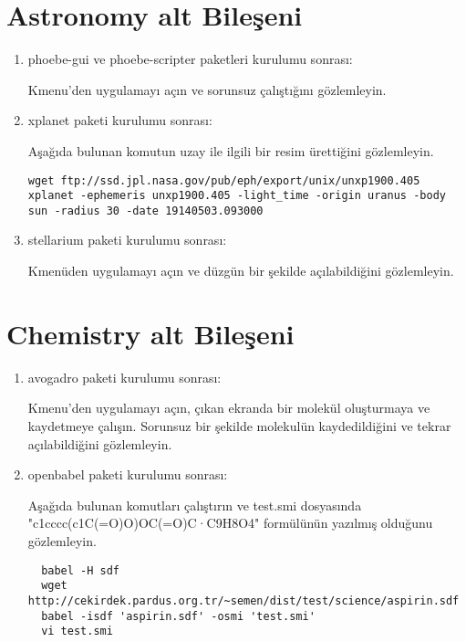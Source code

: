 \documentclass[a4paper,10pt]{article}
\begin{document}
\section{Astronomy alt Bileşeni}
\begin{enumerate}
\item phoebe-gui ve phoebe-scripter paketleri kurulumu sonrası:

Kmenu'den uygulamayı açın ve sorunsuz çalıştığını gözlemleyin.

\item xplanet paketi kurulumu sonrası:

Aşağıda bulunan komutun uzay ile ilgili bir resim ürettiğini gözlemleyin.
\begin{verbatim}
wget ftp://ssd.jpl.nasa.gov/pub/eph/export/unix/unxp1900.405
xplanet -ephemeris unxp1900.405 -light_time -origin uranus -body sun -radius 30 -date 19140503.093000  
\end{verbatim}

 \item stellarium paketi kurulumu sonrası:

Kmenüden uygulamayı açın ve düzgün bir şekilde açılabildiğini gözlemleyin. 
\end{enumerate}

\section{Chemistry alt Bileşeni}
\begin{enumerate}
 \item avogadro paketi kurulumu sonrası:

Kmenu'den uygulamayı açın, çıkan ekranda bir molekül oluşturmaya ve kaydetmeye çalışın. Sorunsuz bir şekilde molekulün kaydedildiğini ve tekrar açılabildiğini gözlemleyin.

 \item openbabel paketi kurulumu sonrası:

Aşağıda bulunan komutları çalıştırın ve test.smi dosyasında "c1cccc(c1C(=O)O)OC(=O)C·C9H8O4" formülünün yazılmış olduğunu gözlemleyin.
\begin{verbatim}
  babel -H sdf
  wget http://cekirdek.pardus.org.tr/~semen/dist/test/science/aspirin.sdf
  babel -isdf 'aspirin.sdf' -osmi 'test.smi'
  vi test.smi
\end{verbatim}

\end{enumerate}
\end{document}
